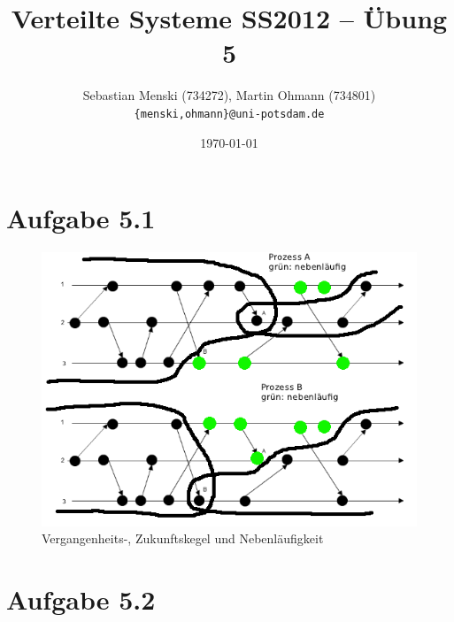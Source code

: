 \documentclass[german,12pt,a4paper]{article}
\begin{document}
\title{\textbf{Verteilte Systeme SS2012 -- Übung 5}}
\author{Sebastian Menski (734272), Martin Ohmann (734801) \\ \texttt{\{menski,ohmann\}@uni-potsdam.de}}
\date{\today}

\maketitle

\section*{Aufgabe 5.1}

\begin{figure}[h!]
  \centering
  \includegraphics[width=1\textwidth]{aufgabe1.png}
  \caption{Vergangenheits-, Zukunftskegel und Nebenläufigkeit}
\end{figure}

\section*{Aufgabe 5.2}
\end{document}
